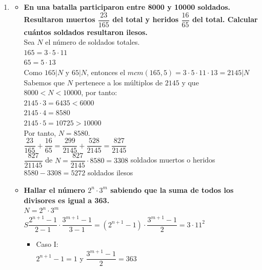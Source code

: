 \documentclass[12pt,a4paper, reqno]{article}
\begin{document}
\begin{enumerate}
    \item %

    \begin{itemize}
        \item [a)] \textbf{En una batalla participaron entre 8000 y 10000 soldados. Resultaron muertos $\dfrac{23}{165}$ del total y heridos $\dfrac{16}{65}$ del total. Calcular cuántos soldados resultaron ilesos. }\\

        Sea $N$ el número de soldados totales. \\

        $165= 3 \cdot 5 \cdot 11$\\
        $65=5 \cdot 13$\\

        Como $165|N$ y $65|N$, entonces el $mcm(165,5)=3 \cdot 5 \cdot 11 \cdot 13=2145|N$\\

        Sabemos que $N$ pertenece a los múltiplos de $2145$ y que $8000<N<10000$, por tanto:\\

        $2145 \cdot 3= 6435 <6000$\\
        $2145 \cdot 4= 8580$\\
        $2145 \cdot 5= 10725 >10000$\\

        Por tanto, $N=8580$.\\

        $\dfrac{23}{165}+\dfrac{16}{65}=\dfrac{299}{2145}+\dfrac{528}{2145}=\dfrac{827}{2145}$\\

        $\dfrac{827}{21145}$ de $N= \dfrac{827}{2145} \cdot 8580=3308$ soldados muertos o heridos\\

        $8580-3308=5272$ soldados ilesos\\


        \item [b)] \textbf{Hallar el número $2^n \cdot 3^m$ sabiendo que la suma de todos los divisores es igual a 363.} \\

        $N=2^n \cdot 3^m$\\

        $S\dfrac{2^{n+1}-1}{2-1} \cdot \dfrac{3^{m+1}-1}{3-1}=(2^{n+1}-1) \cdot \dfrac{3^{m+1}-1}{2}= 3 \cdot 11^2$\\

        \begin{itemize}
            \item Caso I:\\
        $2^{n+1}-1=1$ y $\dfrac{3^{m+1}-1}{2}=363$\\


\end{itemize}
\end{itemize}
\end{enumerate}
\end{document}
